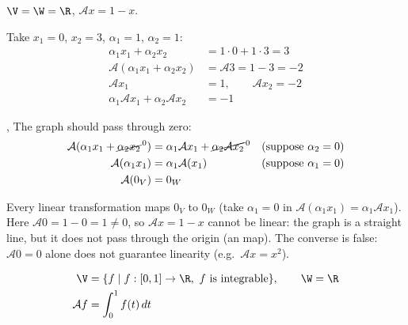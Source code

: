 \begin{example}
$\V=\W=\R$, \quad $\mathcal{A}x=1-x$.

\begin{center}
\end{center}

Take $x_1=0$, $x_2=3$, $\alpha_1=1$, $\alpha_2=1$:
\begin{align*}
\alpha_1x_1+\alpha_2x_2 &= 1\cdot 0+1\cdot 3=3\\
\mathcal{A}(\alpha_1x_1+\alpha_2x_2) &= \mathcal{A}3=1-3=-2\\
\mathcal{A}x_1 &= 1, \qquad \mathcal{A}x_2=-2\\
\alpha_1\mathcal{A}x_1+\alpha_2\mathcal{A}x_2 &= -1
\end{align*}

\sep
The graph should pass through zero: 
\begin{align*}
\mathcal{A}(\alpha_1x_1+\cancel{\alpha_2x_2}^{\,0}) &= \alpha_1\mathcal{A}x_1+\cancel{\alpha_2\mathcal{A}x_2}^{\,0}
  && \text{(suppose } \alpha_2=0)\\
\mathcal{A}(\alpha_1x_1) &= \alpha_1\mathcal{A}(x_1) && \text{(suppose } \alpha_1=0)\\
\mathcal{A}(0_V) &= 0_W
\end{align*}
\begin{insight}
Every linear transformation maps $0_V$ to $0_W$ (take $\alpha_1=0$ in $\mathcal{A}(\alpha_1x_1)=\alpha_1\mathcal{A}x_1$). Here $\mathcal{A}0=1-0=1\ne0$, so $\mathcal{A}x=1-x$ cannot be linear: the graph is a straight line, but it does not pass through the origin (an  map). The converse is false: $\mathcal{A}0=0$ alone does not guarantee linearity (e.g.\ $\mathcal{A}x=x^2$).
\end{insight}
\end{example}

\begin{example}\leavevmode{}
\begin{align*}
\V &= \{f \mid f:[0,1]\to\R,\ f \text{ is integrable}\}, \qquad \W = \R\\
\mathcal{A}f &= \int_0^1 f(t)\,dt
\end{align*}
\end{example}

